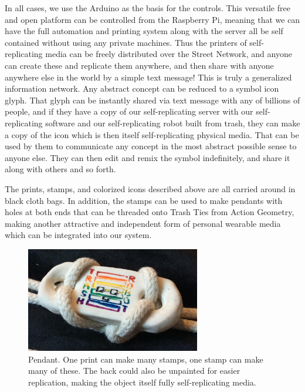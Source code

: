 In all cases, we use the Arduino as the basis for the controls.  This versatile free and open platform can be controlled from the Raspberry Pi, meaning that we can have the full automation and printing system along with the server all be self contained without using any private machines.  Thus the printers of self-replicating media can be freely distributed over the Street Network, and anyone can create these and replicate them anywhere, and then share with anyone anywhere else in the world by a simple text message! This is truly a generalized information network.  Any abstract concept can be reduced to a symbol icon glyph.  That glyph can be instantly shared via text message with any of billions of people, and if they have a copy of our self-replicating server with our self-replicating software and our self-replicating robot built from trash, they can make a copy of the icon which is then itself self-replicating physical media.  That can be used by them to communicate any concept in the most abstract possible sense to anyone else.  They can then edit and remix the symbol indefinitely, and share it along with others and so forth.

The prints, stamps, and colorized icons described above are all carried around in black cloth bags.  In addition, the stamps can be used to make pendants with holes at both ends that can be threaded onto Trash Ties from Action Geometry, making another attractive and independent form of personal wearable media which can be integrated into our system.









\begin{figure}
	\centering
	\includegraphics[width=3in]{figures/machines/pendant.png}
	\caption[pendant]
	{Pendant.  One print can make many stamps, one stamp can make many of these.  The back could also be unpainted for easier replication, making the object itself fully self-replicating media.}
\end{figure}
